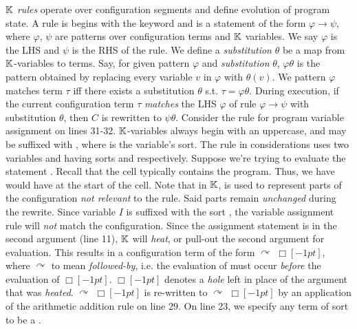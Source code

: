 $\mathbb{K}$ \emph{rules} operate over configuration segments and define evolution of
program state. A rule is begins with the keyword 
and is a statement of the form $\varphi \rightarrow \psi$, where
$\varphi$, $\psi$ are patterns over configuration terms and $\mathbb{K}$ variables.
We say $\varphi$ is the LHS and $\psi$ is the RHS of the rule.
We define a \emph{substitution} $\theta$ be a map from $\mathbb{K}$-variables to terms.
Say, for given pattern $\varphi$ and \emph{substitution} $\theta$,
$\varphi\theta$ is the pattern obtained by replacing every variable $v$ in
$\varphi$ with $\theta(v)$. We pattern $\varphi$ matches
term $\tau$ iff there exists a substitution $\theta$ s.t. $\tau = \varphi\theta$.
During execution, if the current configuration term
$\tau$ \emph{matches} the LHS $\varphi$ of rule $\varphi \rightarrow \psi$
with substitution $\theta$, then $C$ is rewritten to $\psi\theta$.
Consider the rule for program variable assignment on lines 31-32.
$\mathbb{K}$-variables always begin with an uppercase, and may be suffixed with
, where  is the variable's sort.
The rule in considerations uses two variables  and 
having sorts  and  respectively. Suppose
we're trying to evaluate the statement .
Recall that the  cell typically contains
the program. Thus, we have would have  at the start
of the cell. Note that in $\mathbb{K}$,  is used to represent
parts of the configuration \emph{not relevant} to the rule. Said parts remain
\emph{unchanged} during the rewrite. Since variable $I$ is suffixed with the sort
, the variable assignment rule will \emph{not} match the
configuration. Since the assignment statement is  in
the second argument (line 11), $\mathbb{K}$ will \emph{heat}, or pull-out the second
argument for evaluation. This results in a configuration term of the form
 $\curvearrowright$ $ \Box[-1pt]$, where  $\curvearrowright$ to mean \emph{followed-by}, i.e.
the evaluation of  must occur \emph{before} the evaluation
of $\Box[-1pt]$\inlinek{;}. $\Box[-1pt]$
denotes a \emph{hole} left in place of the argument that was \emph{heated}.
 $\curvearrowright$  $\Box[-1pt]$ is re-written to  $\curvearrowright$ $
\Box[-1pt]$ by an application of the arithmetic addition rule on line 29. On
line 23, we specify any term of sort  to be a .
